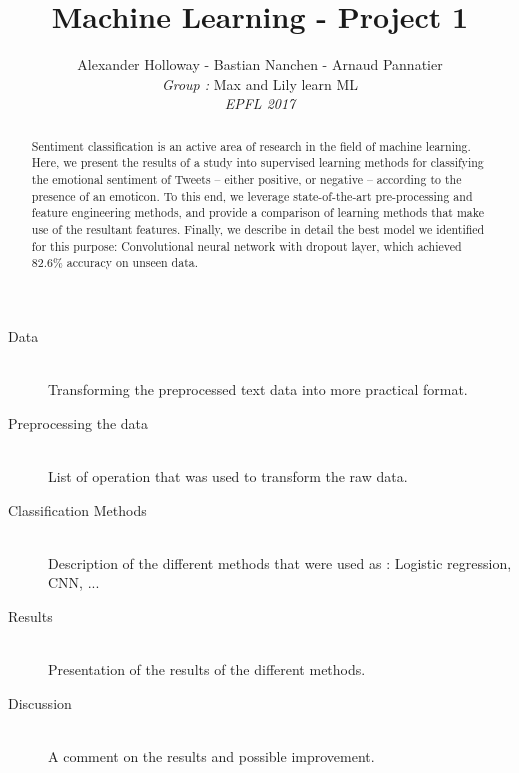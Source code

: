 \documentclass[10pt,conference,compsocconf]{IEEEtran}
\begin{document}
\title{Machine Learning - Project 1}
\author{
 Alexander Holloway - Bastian Nanchen - Arnaud Pannatier 
  \\
  \textit{Group : }Max and Lily learn ML \\
  \textit{EPFL 2017}
}
\maketitle

\begin{abstract}
Sentiment classification is an active area of research in the field of machine learning. Here, we present the results of a study into supervised learning methods for classifying the emotional sentiment of Tweets -- either positive, or negative -- according to the presence of an emoticon. To this end, we leverage state-of-the-art pre-processing and feature engineering methods, and provide a comparison of learning methods that make use of the resultant features. Finally, we describe in detail the best model we identified for this purpose: Convolutional neural network with dropout layer, which achieved 82.6\% accuracy on unseen data.
\end{abstract}

\begin{description}
\item[Data] \ \\
Transforming the preprocessed text data into more practical format. 
\item[Preprocessing the data] \ \\
List of operation that was used to transform the raw data.
\item[Classification Methods] \ \\
Description of the different methods that were used as : Logistic regression, CNN, ...
\item[Results] \ \\
Presentation of the results of the different methods.
\item[Discussion] \ \\
 A comment on the results and possible improvement.  
\end{description}









\end{document}
